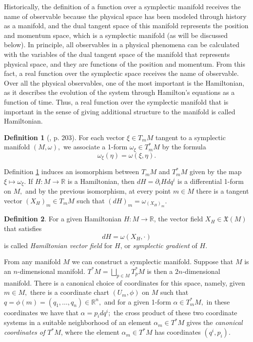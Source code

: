 \documentclass[12pt, letterpaper, reqno]{amsart}
\theoremstyle{definition}
\newtheorem{df}{Definition}
\theoremstyle{plain}
\theoremstyle{remark}
\begin{document}
Historically, the definition of a function over a symplectic manifold receives the name of observable because the physical space has been modeled through history as a manifold, and the dual tangent space of this manifold represents the position and momentum space, which is a symplectic manifold (as will be discussed below). In principle, all observables in a physical phenomena can be calculated with the variables of the dual tangent space of the manifold that represents physical space, and they are functions of the position and momentum. From this fact, a real function over the symplectic space receives the name of observable. Over all the physical observables, one of the most important is the Hamiltonian, as it describes the evolution of the system through Hamilton's equations as a function of time. Thus, a real function over the symplectic manifold that is important in the sense of giving additional structure to the manifold is called Hamiltonian.

\begin{df}[\cite{arnol2013mathematical}, p. 203] \label{df:symplectic_form}
	For each vector $ \xi\in T_mM  $ tangent to a symplectic manifold $ (M,\omega), $ we associate a 1-form $ \omega_\xi\in T^*_mM $ by the formula $$ \omega_\xi(\eta)=\omega(\xi,\eta). $$  
\end{df}

Definition \ref{df:symplectic_form} induces an isomorphism between $ T_mM $ and $ T^*_mM $ given by the map $ \xi \mapsto \omega_\xi. $ If $ H: M \rightarrow \mathbb{R} $ is a Hamiltonian, then $ dH = \partial_i H dq^i $ is a differential 1-form on $ M, $ and by the previous isomorphism, at every point $ m\in M $ there is a tangent vector $ (X_H)_m \in T_mM $ such that $ (dH)_m = \omega_{(X_H)_m}. $ 

\begin{df}
	For a given Hamiltonian $ H: M \rightarrow \mathbb{R} $, the vector field $ X_H\in \mathfrak{X}(M) $ that satisfies $$ dH = \omega(X_H, \cdot) $$ is called \textit{Hamiltonian vector field} for $ H $, or \textit{symplectic gradient} of $ H. $ 
\end{df}

From any manifold $ M $ we can construct a symplectic manifold. Suppose that $ M $ is an $ n$-dimensional manifold. $ T^*M= \bigsqcup_{p\in M} T^*_p M$ is then a $ 2n $-dimensional manifold. There is a canonical choice of coordinates for this space, namely, given $ m\in M, $ there is a coordinate chart $ (U_m,\phi) $ on $ M $ such that $ q=\phi(m)=(q_1,\dots,q_n)\in \mathbb{R}^n, $ and for a given 1-form $ \alpha\in T_m^*M,$ in these coordinates we have that $ \alpha=p_i dq^i; $ the cross product of these two coordinate systems in a suitable neighborhood of an element $ \alpha_m\in T^*M $ gives the \textit{canonical coordinates of $ T^*M $}, where the element $ \alpha_m\in T^*M $ has coordinates $ (q^i,p_i) $.
\end{document}
